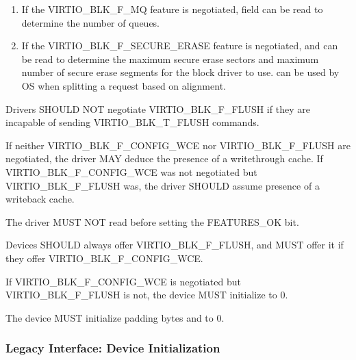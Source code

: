 \begin{enumerate}
\item If the VIRTIO_BLK_F_MQ feature is negotiated,  field
    can be read to determine the number of queues.

\item If the VIRTIO_BLK_F_SECURE_ERASE feature is negotiated,
     and  can be read
    to determine the maximum secure erase sectors and maximum number of
    secure erase segments for the block driver to use.
     can be used by OS when splitting a
    request based on alignment.

\end{enumerate}


Drivers SHOULD NOT negotiate VIRTIO_BLK_F_FLUSH if they are incapable of
sending VIRTIO_BLK_T_FLUSH commands.

If neither VIRTIO_BLK_F_CONFIG_WCE nor VIRTIO_BLK_F_FLUSH are
negotiated, the driver MAY deduce the presence of a writethrough cache.
If VIRTIO_BLK_F_CONFIG_WCE was not negotiated but VIRTIO_BLK_F_FLUSH was,
the driver SHOULD assume presence of a writeback cache.

The driver MUST NOT read  before setting
the FEATURES_OK  bit.


Devices SHOULD always offer VIRTIO_BLK_F_FLUSH, and MUST offer it
if they offer VIRTIO_BLK_F_CONFIG_WCE.

If VIRTIO_BLK_F_CONFIG_WCE is negotiated but VIRTIO_BLK_F_FLUSH
is not, the device MUST initialize  to 0.

The device MUST initialize padding bytes  and
 to 0.

\subsubsection{Legacy Interface: Device Initialization}\label{sec:Device Types / Block Device / Device Initialization / Legacy Interface: Device Initialization}

